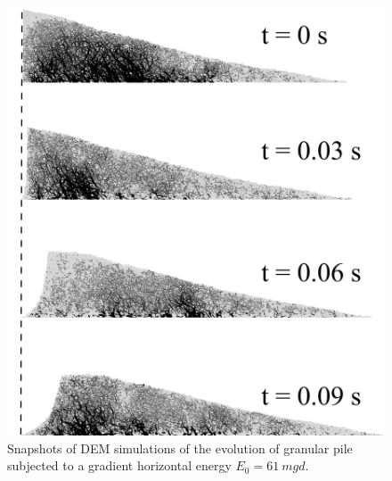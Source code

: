\begin{figure}[tbph]
\centering
\includegraphics[width=\textwidth]{Uniform_Slope_DEM_200J}
\caption{Snapshots of DEM simulations of the evolution of granular pile 
subjected to a gradient horizontal energy $E_0 = 61 \ mgd$.}
\label{fig:Uniform_Slope_DEM_200J}
\end{figure}


